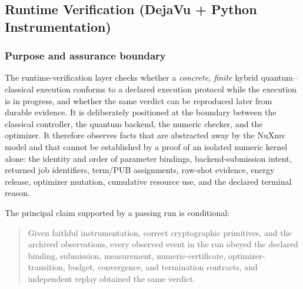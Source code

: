 %
%

\subsection{Runtime Verification (DejaVu + Python Instrumentation)}
\label{sec:runtime-verification}

\subsubsection{Purpose and assurance boundary}

The runtime-verification layer checks whether a \emph{concrete, finite}
hybrid quantum--classical execution conforms to a declared execution protocol
while the execution is in progress, and whether the same verdict can be
reproduced later from durable evidence.  It is deliberately positioned at the
boundary between the classical controller, the quantum backend, the numeric
checker, and the optimizer.  It therefore observes facts that are abstracted
away by the NuXmv model and that cannot be established by a proof of an
isolated numeric kernel alone: the identity and order of parameter bindings,
backend-submission intent, returned job identifiers, term/PUB assignments,
raw-shot evidence, energy release, optimizer mutation, cumulative resource
use, and the declared terminal reason.

The principal claim supported by a passing run is conditional:

\begin{quote}
Given faithful instrumentation, correct cryptographic primitives, and the
archived observations, every observed event in the run obeyed the declared
binding, submission, measurement, numeric-certificate, optimizer-transition,
budget, convergence, and termination contracts, and independent replay
obtained the same verdict.
\end{quote}

